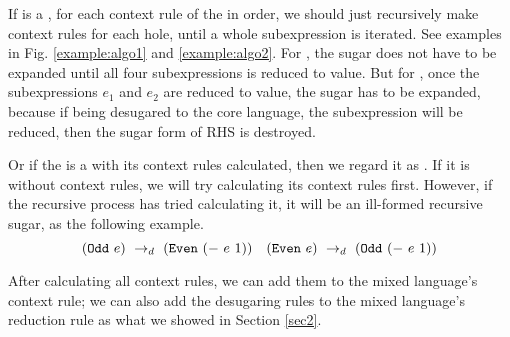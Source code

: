 If  is a , for each context rule of the  in order, we should just recursively make context rules for each hole, until a whole subexpression is iterated. See examples in Fig.  \ref{example:algo1} and \ref{example:algo2}. For , the sugar does not have to be expanded until all four subexpressions is reduced to value. But for , once the subexpressions $e_1$ and $e_2$ are reduced to value, the sugar has to be expanded, because if being desugared to the core language, the subexpression  will be reduced, then the sugar form of RHS is destroyed.


Or if the  is a  with its context rules calculated, then we regard it as . If it is without context rules, we will try calculating its context rules first. However, if the recursive process has tried calculating it, it will be an ill-formed recursive sugar, as the following example.
\[
(\mbox{\tt Odd}~e) ~\rightarrow_d~ (\mbox{\tt Even}~(-~e~1))\quad
(\mbox{\tt Even}~e) ~\rightarrow_d~ (\mbox{\tt Odd}~(-~e~1))
\]

After calculating all context rules, we can add them to the mixed language's context rule; we can also add the desugaring rules to the mixed language's reduction rule as what we showed in Section \ref{sec2}.

